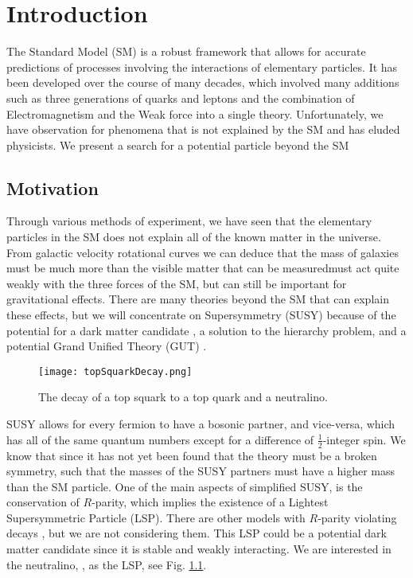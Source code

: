 \chapter{Introduction}
\label{ch:Intro}

The Standard Model (SM) \cite{gaillard_standard_1999} is a robust framework that allows for accurate predictions of processes involving the interactions of elementary particles. It has been developed over the course of many decades, which involved many additions such as three generations of quarks and leptons and the combination of Electromagnetism and the Weak force into a single theory. Unfortunately, we have observation for phenomena that is not explained by the SM and has eluded physicists. We present a search for a potential particle beyond the SM
\section{Motivation}
\label{sec:Motivation}

Through various methods of experiment, we have seen that the elementary particles in the SM does not explain all of the known matter in the universe. From galactic velocity rotational curves we can deduce that the mass of galaxies must be much more than the visible matter that can be measuredmust act quite weakly with the three forces of the SM, but can still be important for gravitational effects. There are many theories beyond the SM that can explain these effects, but we will concentrate on Supersymmetry (SUSY) \cite{ramond_dual_1971, volkov_possible_1972, wess_supergauge_1974, fayet_supergauge_1975, barbieri_gauge_1982, chamseddine_locally_1982, hall_supergravity_1983, kane_study_1994, papucci_natural_2012} because of the potential for a dark matter candidate \cite{feng_dark_2010, bertone_dark_2005}, a solution to the hierarchy problem, and a potential Grand Unified Theory (GUT) \cite{georgi_unity_1974, georgi_hierarchy_1974, buras_aspects_1978}.

\begin{figure}
 	\centering
	\texttt{[image: topSquarkDecay.png]}
 	\caption[Top Squark Decay]{The decay of a top squark to a top quark and a neutralino.}
 	\label{topSquarkDecay} 
\end{figure}

SUSY allows for every fermion to have a bosonic partner, and vice-versa, which has all of the same quantum numbers except for a difference of $\frac{1}{2}$-integer spin. We know that since it has not yet been found that the theory must be a broken symmetry, such that the masses of the SUSY partners must have a higher mass than the SM particle. One of the main aspects of simplified SUSY, is the conservation of $R$-parity, which implies the existence of a Lightest Supersymmetric Particle (LSP). There are other models with $R$-parity violating decays \cite{barbier_r-parity-violating_2005, grossman_sneutrino_1999}, but we are not considering them. This LSP could be a potential dark matter candidate since it is stable and weakly interacting. We are interested in the neutralino, \neutralino, as the LSP, see Fig. \ref{topSquarkDecay}. 

